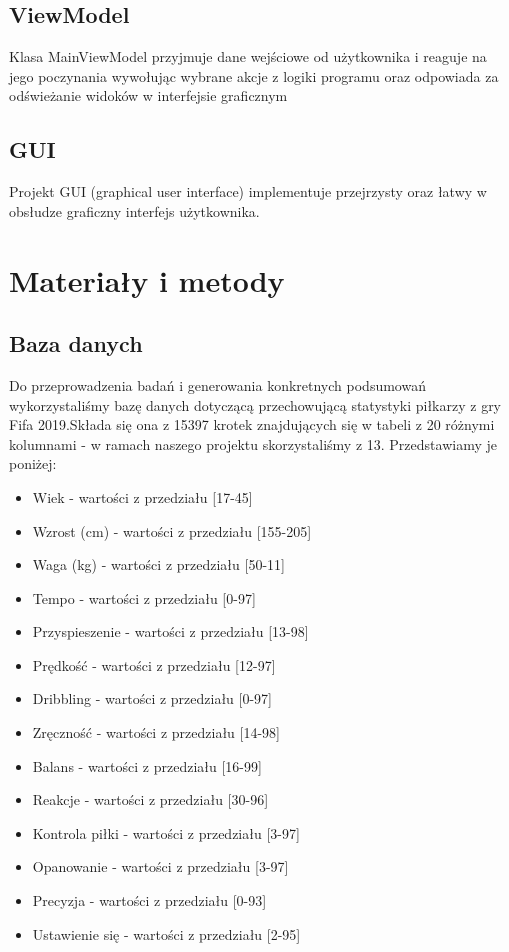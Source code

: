 \documentclass{classrep}
\begin{document}
\subsection{ViewModel}

Klasa MainViewModel przyjmuje dane wejściowe od użytkownika i reaguje na jego poczynania wywołując wybrane akcje z logiki programu oraz odpowiada za odświeżanie widoków w interfejsie graﬁcznym

\subsection{GUI}

Projekt GUI (graphical user interface) implementuje przejrzysty oraz łatwy w obsłudze graﬁczny interfejs użytkownika.

\section{Materiały i metody}

\subsection{Baza danych}
Do przeprowadzenia badań i generowania konkretnych podsumowań wykorzystaliśmy bazę danych dotyczącą przechowującą statystyki piłkarzy z gry Fifa 2019.Składa się ona z 15397 krotek znajdujących się w tabeli z 20 różnymi kolumnami - w ramach naszego projektu skorzystaliśmy z 13. Przedstawiamy je poniżej:

\begin{itemize}
	\item Wiek - wartości z przedziału [17-45]
	\item Wzrost (cm) - wartości z przedziału [155-205]
	\item Waga (kg) - wartości z przedziału [50-11] 
	\item Tempo - wartości z przedziału [0-97]
	\item Przyspieszenie - wartości z przedziału [13-98]
	\item Prędkość - wartości z przedziału [12-97]
	\item Dribbling - wartości z przedziału [0-97]
	\item Zręczność - wartości z przedziału [14-98]
	\item Balans - wartości z przedziału [16-99]
	\item Reakcje - wartości z przedziału [30-96]
	\item Kontrola piłki - wartości z przedziału [3-97]
	\item Opanowanie - wartości z przedziału [3-97]
	\item Precyzja - wartości z przedziału [0-93]
	\item Ustawienie się - wartości z przedziału [2-95]
\end{itemize}
\end{document}
